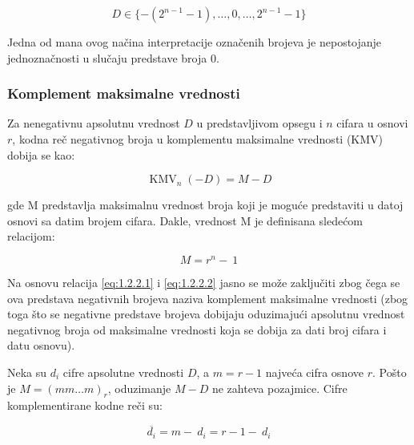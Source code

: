 \documentclass[a4paper,11pt]{article}
\numberwithin{equation}{section}
\begin{document}
\begin{equation}\label{eq:1.2.1.1}
D\in\{-(2^{n-1}-1),\dots,0,\dots,2^{n-1}-1\}
\end{equation}


Jedna od mana ovog načina interpretacije označenih brojeva je nepostojanje jednoznačnosti u slučaju predstave broja 0.



\subsubsection{Komplement maksimalne vrednosti}\label{sec:1.2.2}


Za nenegativnu apsolutnu vrednost $D$ u predstavljivom opsegu i $n$ cifara u osnovi $r$, kodna reč negativnog broja u komplementu maksimalne vrednosti (KMV) dobija se kao:

\begin{equation}\label{eq:1.2.2.1}
\operatorname{KMV}_n(-D)=M-D
\end{equation}


gde M predstavlja maksimalnu vrednost broja koji je moguće predstaviti u datoj osnovi sa datim brojem cifara. Dakle, vrednost M je definisana sledećom relacijom:



\begin{equation}\label{eq:1.2.2.2}
M = r^{n} - \ 1
\end{equation}


Na osnovu relacija \eqref{eq:1.2.2.1} i \eqref{eq:1.2.2.2} jasno se može zaključiti zbog čega se ova predstava negativnih brojeva naziva komplement maksimalne vrednosti (zbog toga što se negativne predstave brojeva dobijaju oduzimajući apsolutnu vrednost negativnog broja od maksimalne vrednosti koja se dobija za dati broj cifara i datu osnovu).



Neka su $d_i$ cifre apsolutne vrednosti $D$, a $m=r-1$ najveća cifra osnove $r$. Pošto je $M=(mm\dots m)_r$, oduzimanje $M-D$ ne zahteva pozajmice. Cifre komplementirane kodne reči su:



\begin{equation}\label{eq:1.2.2.3}
\overline{d_{i}} = m - \ d_{i} = r - 1 - \ d_{i}
\end{equation}
\end{document}
